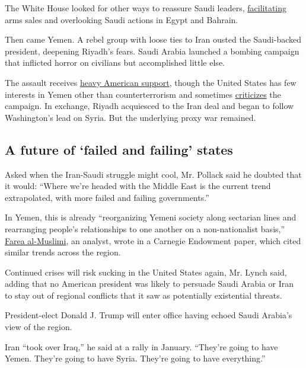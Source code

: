 The White House looked for other ways to reassure Saudi leaders,
\href{http://www.reuters.com/article/us-airshow-britain-usa-arms-idUSKCN0ZT0ZH}{facilitating}
arms sales and overlooking Saudi actions in Egypt and Bahrain.

Then came Yemen. A rebel group with loose ties to Iran ousted the
Saudi-backed president, deepening Riyadh's fears. Saudi Arabia launched
a bombing campaign that inflicted horror on civilians but accomplished
little else.

The assault receives
\href{http://www.wsj.com/articles/u-s-widens-role-in-saudi-led-campaign-against-yemen-rebels-1428882967}{heavy
American support}, though the United States has few interests in Yemen
other than counterterrorism and sometimes
\href{http://www.al-monitor.com/pulse/originals/2016/10/yemen-war-us-attacks-houthis-saudi-arabia.html}{criticizes}
the campaign. In exchange, Riyadh acquiesced to the Iran deal and began
to follow Washington's lead on Syria. But the underlying proxy war
remained.

\hypertarget{a-future-of-failed-and-failing-states}{%
\subsection{A future of `failed and failing'
states}\label{a-future-of-failed-and-failing-states}}

Asked when the Iran-Saudi struggle might cool, Mr. Pollack said he
doubted that it would: ``Where we're headed with the Middle East is the
current trend extrapolated, with more failed and failing governments.''

In Yemen, this is already ``reorganizing Yemeni society along sectarian
lines and rearranging people's relationships to one another on a
non-nationalist basis,''
\href{http://carnegie-mec.org/diwan/62375?lang=en}{Farea al-Muslimi}, an
analyst, wrote in a Carnegie Endowment paper, which cited similar trends
across the region.

Continued crises will risk sucking in the United States again, Mr. Lynch
said, adding that no American president was likely to persuade Saudi
Arabia or Iran to stay out of regional conflicts that it saw as
potentially existential threats.

President-elect Donald J. Trump will enter office having echoed Saudi
Arabia's view of the region.

Iran ``took over Iraq,'' he said at a rally in January. ``They're going
to have Yemen. They're going to have Syria. They're going to have
everything.''

